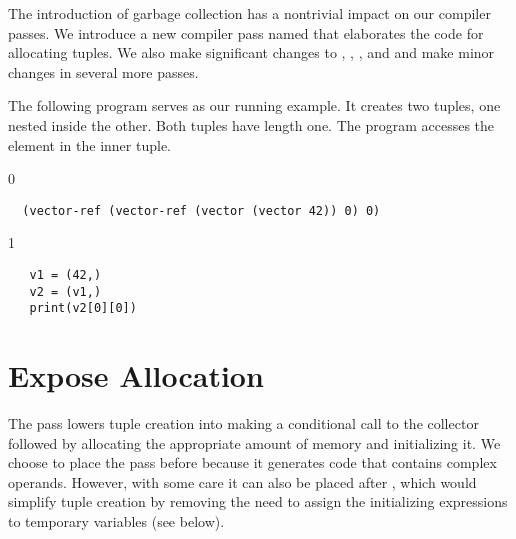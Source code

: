 \documentclass[7x10]{TimesAPriori_MIT}%
\def\racketEd{0}
\def\pythonEd{1}
\def\edition{1}
\newcommand{\pythonColor}[0]{}
\numberwithin{theorem}{chapter}
\numberwithin{definition}{chapter}
\numberwithin{equation}{chapter}
\begin{document}
The introduction of garbage collection has a nontrivial impact on our
compiler passes. We introduce a new compiler pass named
 that elaborates the code for allocating
tuples. We also make significant changes to
, ,
, and  and
make minor changes in several more passes.

The following program serves as our running example.  It creates
two tuples, one nested inside the other. Both tuples have length
one. The program accesses the element in the inner tuple.
{\if\edition\racketEd
\begin{lstlisting}
  (vector-ref (vector-ref (vector (vector 42)) 0) 0)
\end{lstlisting}
\fi}
{\if\edition\pythonEd\pythonColor
\begin{lstlisting}
   v1 = (42,)
   v2 = (v1,)
   print(v2[0][0])
\end{lstlisting}
\fi}





\section{Expose Allocation}
\label{sec:expose-allocation}

The pass  lowers tuple creation into making a
conditional call to the collector followed by allocating the
appropriate amount of memory and initializing it.  We choose to place
the  pass before
 because it generates code that
contains complex operands. However, with some care it can also be
placed after , which would simplify
tuple creation by removing the need to assign the initializing
expressions to temporary variables (see below).
\end{document}
